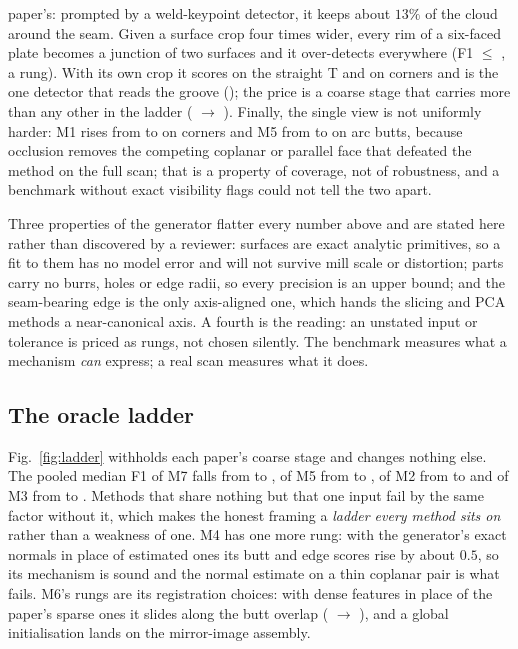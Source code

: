 \documentclass[letterpaper, 10 pt, conference]{ieeeconf}
\newcommand{\M}[1]{M#1}
\begin{document}
paper's: prompted by a weld-keypoint detector, it keeps about $13\%$ of the cloud around the seam. Given a surface crop four times wider, every rim of a six-faced plate becomes a junction of two surfaces and it over-detects everywhere (F1 $\leq$ \regiongrowSurfaceCropMax, a rung). With its own crop it scores \regiongrowTline{} on the straight T and \regiongrowCorner{} on corners and is the one detector that reads the groove (\regiongrowGrooved); the price is a coarse stage that carries more than any other in the ladder (\regiongrowLzero{} $\to$ \regiongrowLone). Finally, the single view is not uniformly harder: \M1 rises from \ransacCornerFull{} to \ransacCornerSingle{} on corners and \M5 from \pcasliceArcFull{} to \pcasliceArcSingle{} on arc butts, because occlusion removes the competing coplanar or parallel face that defeated the method on the full scan; that is a property of coverage, not of robustness, and a benchmark without exact visibility flags could not tell the two apart.

Three properties of the generator flatter every number above and are stated here rather than discovered by a reviewer: surfaces are exact analytic primitives, so a fit to them has no model error and will not survive mill scale or distortion; parts carry no burrs, holes or edge radii, so every precision is an upper bound; and the seam-bearing edge is the only axis-aligned one, which hands the slicing and PCA methods a near-canonical axis. A fourth is the reading: an unstated input or tolerance is priced as rungs, not chosen silently. The benchmark measures what a mechanism \emph{can} express; a real scan measures what it does.

\subsection{The oracle ladder}
Fig.~\ref{fig:ladder} withholds each paper's coarse stage and changes nothing else. The pooled median F1 of \M7 falls from \quadricLzero{} to \quadricLone{}, of \M5 from \pcasliceLzero{} to \pcasliceLone{}, of \M2 from \regiongrowLzero{} to \regiongrowLone{} and of \M3 from \lobbLzero{} to \lobbLone{}. Methods that share nothing but that one input fail by the same factor without it, which makes the honest framing a \emph{ladder every method sits on} rather than a weakness of one. \M4 has one more rung: with the generator's exact normals in place of estimated ones its butt and edge scores rise by about $0.5$, so its mechanism is sound and the normal estimate on a thin coplanar pair is what fails. \M6's rungs are its registration choices: with dense features in place of the paper's sparse ones it slides along the butt overlap (\modelregButt{} $\to$ \modelregDenseButt), and a global initialisation lands on the mirror-image assembly.
\end{document}
